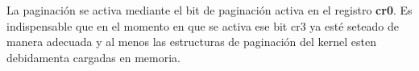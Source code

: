 	La paginación se activa mediante el bit de paginación activa en el
registro \textbf{cr0}. Es indispensable que en el momento en que se
activa ese bit cr3 ya esté seteado de manera adecuada y al menos las
estructuras de paginación del kernel esten debidamenta cargadas en memoria.





\begin{comment}
	La parte de paginación se resolvió de manera bastante intuitiva.

	Se crearon funciones en C que se encargar de inicializar los directorios
de páginas del kernel y de las tareas. Un detalle importante de la implementación
es que tanto el kernel como las tareas comparten las primeras 2 tablas de páginas
de sus directores de páginas.

	Estas dos tablas son las que se hacen con identity mapping. El identity mapping
está en todos los mapas de memoria de la misma manera y con los mismos atributos. Además
nunca debe ser cambiado a lo largo de la ejecución de todo el programa en ninguno de los
mapas. Por eso decidimos crear sólo 2 tablas de páginas y hacer que todas las tareas lo compartan.

	En un princio a cada tarea se le asigna una tabla extra inicializada en cero.
Luego mediante las funciones para mapear páginas se completan estas tablas de manera adecuada
para que se efectivicen los mapeos.

	Es importante notar que el resultado final de esto es que cada tarea tiene mapeadas
2 tablas con identity mapping y con proviligios restringidos (sólo para supervisor) y
luego un par de páginas mas con permisos de usuario, que son donde efectivamente va a trabajar.

	Todo eso se englobó en las siguientes funciones de C:
	
\begin{verbatim}
	void mmu_inicializar_dir_kernel();
	void mmu_inicializar_paginas_kernel();
	void mmu_inicializar_tareas();
\end{verbatim}

	$mmu\_inicializar\_tareas$ no solo inicializar los directorios de páginas sino
que además hace los mapeos de páginas correspondientes.

	Finalmente esas funciones se llaman dentro de kernel.asm. Una vez terminado eso
se habilita la paginación.

\end{comment}
